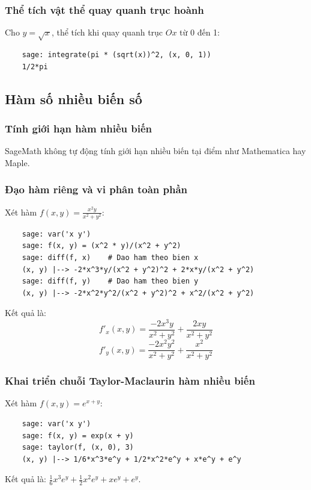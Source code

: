 \subsubsection{Thể tích vật thể quay quanh trục hoành}
Cho \( y = \sqrt{x} \), thể tích khi quay quanh trục $Ox$ từ 0 đến 1:
\begin{lstlisting}
	sage: integrate(pi * (sqrt(x))^2, (x, 0, 1))
	1/2*pi
\end{lstlisting}

\subsection{Hàm số nhiều biến số}

\subsubsection{Tính giới hạn hàm nhiều biến}
SageMath không tự động tính giới hạn nhiều biến tại điểm như Mathematica hay Maple.

\subsubsection{Đạo hàm riêng và vi phân toàn phần}
Xét hàm \( f(x, y) = \frac{x^2 y}{x^2 + y^2} \):
\begin{lstlisting}
	sage: var('x y')
	sage: f(x, y) = (x^2 * y)/(x^2 + y^2)
	sage: diff(f, x)	# Dao ham theo bien x
	(x, y) |--> -2*x^3*y/(x^2 + y^2)^2 + 2*x*y/(x^2 + y^2)
	sage: diff(f, y)	# Dao ham theo bien y
	(x, y) |--> -2*x^2*y^2/(x^2 + y^2)^2 + x^2/(x^2 + y^2)
\end{lstlisting}

Kết quả là:
$$f'_x(x,y)=\dfrac{-2x^3y}{x^2 + y^2}+\dfrac{2xy}{x^2 + y^2}$$
$$f'_y(x,y)=\dfrac{-2x^2y^2}{x^2 + y^2}+\dfrac{x^2}{x^2 + y^2}$$

\subsubsection{Khai triển chuỗi Taylor-Maclaurin hàm nhiều biến}
Xét hàm \( f(x, y) =  e^{x+y}\):
\begin{lstlisting}
	sage: var('x y')
	sage: f(x, y) = exp(x + y)
	sage: taylor(f, (x, 0), 3)
	(x, y) |--> 1/6*x^3*e^y + 1/2*x^2*e^y + x*e^y + e^y
\end{lstlisting}

Kết quả là: $\frac{1}{6}x^3e^y + \frac{1}{2}x^2e^y + xe^y + e^y$.

